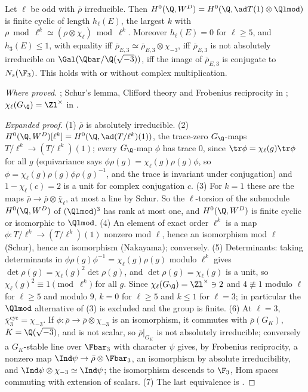 \begin{sloppypar}
\begin{lemma}\label{lem:paper:h0}
Let $\ell$ be odd with $\bar\rho$ irreducible. Then $H^0(\Q,W^D)=H^0(\Q,\ad T(1)\otimes\Qlmod)$ is finite cyclic of length $h_\ell(E)$, the largest $k$ with $\rho\bmod\ell^k\simeq(\rho\otimes\chi_\ell)\bmod\ell^k$.
Moreover $h_\ell(E)=0$ for $\ell\ge5$, and $h_3(E)\le1$, with equality iff $\bar\rho_{E,3}\simeq\bar\rho_{E,3}\otimes\chi_{-3}$, iff $\bar\rho_{E,3}$ is not absolutely irreducible on $\Gal(\Qbar/\Q(\sqrt{-3}))$, iff the image
of $\bar\rho_{E,3}$ is conjugate to $N_s(\F_3)$. This holds with or without complex multiplication.
\end{lemma}

\noindent\emph{Where proved.} ; Schur's lemma, Clifford theory and Frobenius reciprocity in ; $\chi_\ell(G_\Q)=\Zl^\times$ in .

\begin{proof}[Expanded proof]
(1) $\bar\rho$ is absolutely irreducible. (2) $H^0(\Q,W^D)[\ell^k]=H^0(\Q,\ad(T/\ell^k)(1))$, the trace-zero $G_\Q$-maps $T/\ell^k\to(T/\ell^k)(1)$; every $G_\Q$-map $\phi$ has trace $0$, since
$\tr\phi=\chi_\ell(g)\tr\phi$ for all $g$ (equivariance says $\phi\rho(g)=\chi_\ell(g)\rho(g)\phi$, so $\phi=\chi_\ell(g)\rho(g)\phi\rho(g)^{-1}$, and the trace is invariant under conjugation) and
$1-\chi_\ell(c)=2$ is a unit for complex conjugation $c$. (3) For $k=1$ these are the maps $\bar\rho\to\bar\rho\otimes\bar\chi_\ell$, at most a line by Schur.
So the $\ell$-torsion of the submodule $H^0(\Q,W^D)$ of $(\Qlmod)^3$ has rank at most one, and $H^0(\Q,W^D)$ is finite cyclic or isomorphic to $\Qlmod$. (4) An element of exact
order $\ell^k$ is a map $\phi\colon T/\ell^k\to(T/\ell^k)(1)$ nonzero mod $\ell$, hence an isomorphism mod $\ell$ (Schur), hence an isomorphism (Nakayama); conversely. (5) Determinants:
taking determinants in $\phi\rho(g)\phi^{-1}=\chi_\ell(g)\rho(g)$ modulo $\ell^k$ gives $\det\rho(g)=\chi_\ell(g)^2\det\rho(g)$, and $\det\rho(g)=\chi_\ell(g)$ is a unit, so
$\chi_\ell(g)^2\equiv1\pmod{\ell^k}$ for all $g$. Since $\chi_\ell(G_\Q)=\Zl^\times\ni2$ and $4\not\equiv1$ modulo $\ell$ for $\ell\ge5$ and modulo $9$, $k=0$ for $\ell\ge5$ and $k\le1$ for $\ell=3$; in
particular the $\Qlmod$ alternative of (3) is excluded and the group is finite. (6) At $\ell=3$, $\bar\chi_3^{\mathrm{cyc}}=\chi_{-3}$. If $\phi\colon\bar\rho\to\bar\rho\otimes\chi_{-3}$ is an isomorphism, it
commutes with $\bar\rho(G_K)$, $K=\Q(\sqrt{-3})$, and is not scalar, so $\bar\rho|_{G_K}$ is not absolutely irreducible; conversely a $G_K$-stable line over $\Fbar_3$ with character $\psi$ gives, by
Frobenius reciprocity, a nonzero map $\Ind\psi\to\bar\rho\otimes\Fbar_3$, an isomorphism by absolute irreducibility, and $\Ind\psi\otimes\chi_{-3}\simeq\Ind\psi$; the isomorphism descends to $\F_3$,
Hom spaces commuting with extension of scalars. (7) The last equivalence is .
\end{proof}


\end{sloppypar}
